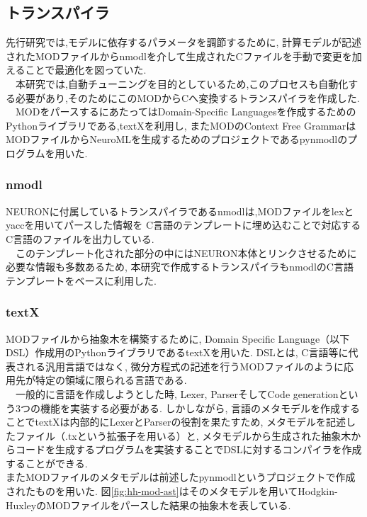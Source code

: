 \subsection{トランスパイラ}
先行研究\cite{miyamoto-master}では,モデルに依存するパラメータを調節するために,
計算モデルが記述されたMODファイルからnmodlを介して生成されたCファイルを手動で変更を加えることで最適化を図っていた.\\
　本研究では,自動チューニングを目的としているため,このプロセスも自動化する必要があり,そのためにこのMODからCへ変換するトランスパイラを作成した.\\
　MODをパースするにあたってはDomain-Specific Languagesを作成するためのPythonライブラリである,textX\cite{textX-repo}を利用し,
またMODのContext Free GrammarはMODファイルからNeuroMLを生成するためのプロジェクトであるpynmodl\cite{pynmodl-repo}のプログラムを用いた.\\

\subsubsection{nmodl}
NEURONに付属しているトランスパイラであるnmodlは,MODファイルをlexとyacc\cite{lex}を用いてパースした情報を
C言語のテンプレートに埋め込むことで対応するC言語のファイルを出力している.\\
　このテンプレート化された部分の中にはNEURON本体とリンクさせるために必要な情報も多数あるため,
本研究で作成するトランスパイラもnmodlのC言語テンプレートをベースに利用した.\\

\subsubsection{textX}
MODファイルから抽象木を構築するために, Domain Specific Language（以下DSL）作成用のPythonライブラリであるtextX\cite{textX}を用いた.
DSLとは, C言語等に代表される汎用言語ではなく, 微分方程式の記述を行うMODファイルのように応用先が特定の領域に限られる言語である.\\
　一般的に言語を作成しようとした時, Lexer, ParserそしてCode generationという3つの機能を実装する必要がある.
しかしながら, 言語のメタモデルを作成することでtextXは内部的にLexerとParserの役割を果たすため,
メタモデルを記述したファイル（.txという拡張子を用いる）と, メタモデルから生成された抽象木からコードを生成するプログラムを実装することでDSLに対するコンパイラを作成することができる.\\
またMODファイルのメタモデルは前述したpynmodlというプロジェクトで作成されたものを用いた. 図\ref{fig:hh-mod-ast}はそのメタモデルを用いてHodgkin-HuxleyのMODファイルをパースした結果の抽象木を表している.\\


